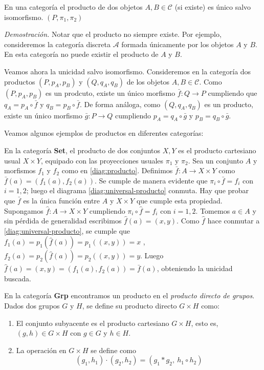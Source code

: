 \begin{proposicion}
    En una categoría  el producto de dos objetos $A,B \in \mathscr{C}$ (si existe) es único salvo isomorfismo.
    $(P, \pi_{1}, \pi_{2})$
\end{proposicion}
\textit{Demostración.} Notar que el producto no siempre existe.  Por ejemplo, consideremos la categoría discreta 
$\mathscr{A}$ formada únicamente por los objetos $A$ y $B$. En esta categoría no puede existir el producto de $A$ y $B$.

Veamos ahora la unicidad salvo isomorfismo. Consideremos en la categoría  dos productos $(P, p_A, p_B)$ y $(Q, q_A, q_B)$ de los
objetos $A,B \in \mathscr{C}$. Como $(P, p_A, p_B)$ es un prodcuto, existe un único morfismo $\bar{f}: Q \longrightarrow P $ cumpliendo que 
$q_A = p_A \circ \bar{f}$ y  $q_B = p_B \circ \bar{f}$. De forma análoga, como $(Q, q_A, q_B)$ es un producto, existe un único morfismo 
$\bar{g}: P \longrightarrow Q $ cumpliendo $p_A = q_A \circ \bar{g}$ y  $p_B = q_B \circ \bar{g}$.


Veamos algunos ejemplos de productos en diferentes categorías:

\begin{ejemplo}
    En la categoría \textbf{Set}, el producto de dos conjuntos $X,Y$ es el producto cartesiano usual $X \times Y$, equipado con las proyecciones usuales $\pi_{1}$ y $\pi_{2}$. Sea un conjunto $A$ y morfismos $f_1$ y $f_2$ como en \ref{diag:producto}. Definimos $\bar{f}: A \longrightarrow X \times Y$ como $\bar{f}(a) = (f_1(a),f_2(a))$. Se cumple de manera evidente que $\pi_i \circ \bar{f} = f_i$ con $i=1,2$; luego el diagrama \ref{diag:universal-producto} conmuta. Hay que probar que $\bar{f}$ es la única función entre $A$ y $X \times Y$ que cumple esta propiedad. Supongamos $\hat{f}: A \longrightarrow X \times Y$ cumpliendo $\pi_i \circ \hat{f} = f_i$ con $i=1,2$. Tomemos $a \in A$ y sin pérdida de generalidad escribimos $\hat{f}(a) = (x,y)$. Como $\hat{f}$ hace conmutar a \ref{diag:universal-producto}, se cumple que $f_1(a) = p_1(\hat{f}(a)) = p_1((x,y)) = x$ , $f_2(a) = p_2(\hat{f}(a)) = p_2((x,y)) = y$. Luego $\hat{f}(a) = (x,y) = (f_1(a),f_2(a)) = \bar{f}(a)$, obteniendo la unicidad buscada.
\end{ejemplo}

\begin{ejemplo}
    En la categoría \textbf{Grp} encontramos un producto en el \textit{producto directo de grupos}. Dados dos grupos $G$ y $H$, se define su producto directo $G \times H$ como: 
    \begin{enumerate}
        \item El conjunto subyacente es el producto cartesiano $G\times H$, esto es, $(g,h) \in G \times H$ con $g \in G$ y $h \in H$.
        \item La operación en $G \times H$ se define como \begin{equation}
            (g_1,h_1) \cdot (g_2,h_2) = (g_1*g_2, \ h_1\circ h_2)
        \end{equation}
    \end{enumerate}
\end{ejemplo}

